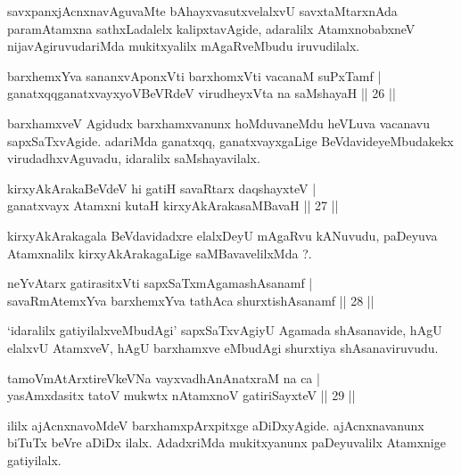 \begin{artha}
savxpanxjAcnxnavAguvaMte bAhayxvasutxvelalxvU savxtaMtarxnAda paramAtamxna sathxLadalelx kalipxtavAgide, adaralilx AtamxnobabxneV nijavAgiruvudariMda mukitxyalilx mAgaRveMbudu iruvudilalx.
\end{artha}

\begin{shl}
barxhemxYva sananxvAponxVti barxhomxVti vacanaM suPxTamf |\\
ganatxqqganatxvayxyoVBeVRdeV virudheyxVta na saMshayaH \hfill || 26 || 
\end{shl}

\begin{artha}
barxhamxveV Agidudx barxhamxvanunx hoMduvaneMdu heVLuva vacanavu sapxSaTxvAgide. adariMda ganatxqq, ganatxvayxgaLige BeVdavideyeMbudakekx virudadhxvAguvadu, idaralilx saMshayavilalx.
\end{artha}

\begin{shl}
kirxyAkArakaBeVdeV hi gatiH savaRtarx daqshayxteV |\\
ganatxvayx Atamxni kutaH kirxyAkArakasaMBavaH \hfill || 27 || 
\end{shl}

\begin{artha}
kirxyAkArakagala BeVdavidadxre elalxDeyU mAgaRvu kANuvudu, paDeyuva Atamxnalilx kirxyAkArakagaLige saMBavavelilxMda ?.
\end{artha}

\begin{shl}
neYvAtarx gatirasitxVti sapxSaTxmAgamashAsanamf |\\
savaRmAtemxYva barxhemxYva tathAca shurxtishAsanamf \hfill || 28 || 
\end{shl}

\begin{artha}
`idaralilx gatiyilalxveMbudAgi' sapxSaTxvAgiyU Agamada shAsanavide, hAgU elalxvU AtamxveV, hAgU barxhamxve eMbudAgi shurxtiya shAsanaviruvudu.
\end{artha}

\begin{shl}
tamoVmAtArxtireVkeVNa vayxvadhAnAnatxraM na ca |\\
yasAmxdasitx tatoV mukwtx nA\s \s tamxnoV gatiriSayxteV \hfill || 29 || 
\end{shl}

\begin{artha}
ililx ajAcnxnavoMdeV barxhamxpArxpitxge aDiDxyAgide. ajAcnxnavanunx biTuTx beVre aDiDx ilalx. AdadxriMda mukitxyanunx paDeyuvalilx Atamxnige gatiyilalx.
\end{artha}

